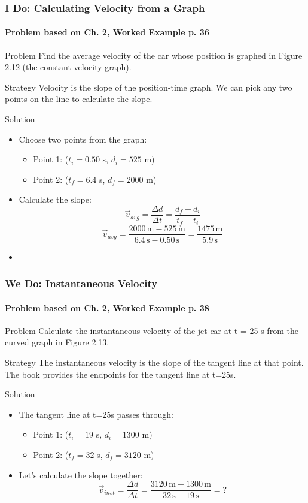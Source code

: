 \documentclass{beamer}
\begin{document}
\begin{frame}
\frametitle{I Do: Calculating Velocity from a Graph}
\framesubtitle{Problem based on Ch. 2, Worked Example p. 36}
\begin{block}{Problem}
Find the average velocity of the car whose position is graphed in Figure 2.12 (the constant velocity graph).
\end{block}
\pause
\begin{block}{Strategy}
Velocity is the slope of the position-time graph. We can pick any two points on the line to calculate the slope.
\end{block}
\pause
\begin{block}{Solution}
\begin{itemize}
    \item Choose two points from the graph:
    \begin{itemize}
        \item Point 1: ($t_i = 0.50$ s, $d_i = 525$ m)
        \item Point 2: ($t_f = 6.4$ s, $d_f = 2000$ m)
    \end{itemize}
    \item Calculate the slope:
    \[ \vec{v}_{avg} = \frac{\Delta d}{\Delta t} = \frac{d_f - d_i}{t_f - t_i} \]
    \[ \vec{v}_{avg} = \frac{2000 \, \text{m} - 525 \, \text{m}}{6.4 \, \text{s} - 0.50 \, \text{s}} = \frac{1475 \, \text{m}}{5.9 \, \text{s}} \]
    \item {}
\end{itemize}
\end{block}
\end{frame}

\begin{frame}
\frametitle{We Do: Instantaneous Velocity}
\framesubtitle{Problem based on Ch. 2, Worked Example p. 38}
\begin{block}{Problem}
Calculate the instantaneous velocity of the jet car at t = 25 s from the curved graph in Figure 2.13.
\end{block}
\pause
\begin{block}{Strategy}
The instantaneous velocity is the slope of the tangent line at that point. The book provides the endpoints for the tangent line at t=25s.
\end{block}
\pause
\begin{block}{Solution}
\begin{itemize}
    \item The tangent line at t=25s passes through:
    \begin{itemize}
        \item Point 1: ($t_i = 19$ s, $d_i = 1300$ m)
        \item Point 2: ($t_f = 32$ s, $d_f = 3120$ m)
    \end{itemize}
    \item \alert{Let's calculate the slope together:}
    \[ \vec{v}_{inst} = \frac{\Delta d}{\Delta t} = \frac{3120 \, \text{m} - 1300 \, \text{m}}{32 \, \text{s} - 19 \, \text{s}} = ? \]
\end{itemize}
\end{block}
\end{frame}
\end{document}
